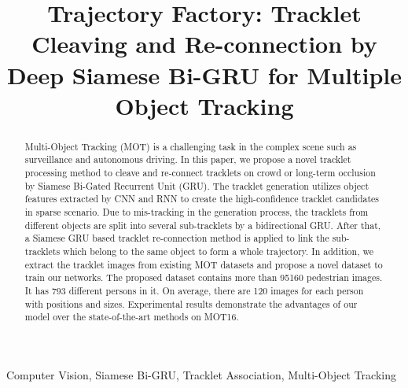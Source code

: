 \documentclass[5pt]{article}
\begin{document}
\sloppy

\def\x{{\mathbf x}}
\def\L{{\cal L}}


\title{Trajectory Factory: Tracklet Cleaving and Re-connection by\\ Deep Siamese Bi-GRU for Multiple Object Tracking}
\address{National Engineering Laboratory for Video Technology, Peking University, Beijing, China \\
\{Cong-Reeshard.Ma, csyang, fyang.eecs, zhuangyq, zhangziw, hzjia, donxie\}@pku.edu.cn}


\maketitle



\begin{abstract}
Multi-Object Tracking (MOT) is a challenging task in the complex scene such as surveillance and autonomous driving. In this paper, we propose a novel tracklet processing method to cleave and re-connect tracklets on crowd or long-term occlusion by Siamese Bi-Gated Recurrent Unit (GRU). The tracklet generation utilizes object features extracted by CNN and RNN to create the high-confidence tracklet candidates in sparse scenario. Due to mis-tracking in the generation process, the tracklets from different objects are split into several sub-tracklets by a bidirectional GRU. After that, a Siamese GRU based tracklet re-connection method is applied to link the sub-tracklets which belong to the same object to form a whole trajectory. In addition, we extract the tracklet images from existing MOT datasets and propose a novel dataset to train our networks. The proposed dataset contains more than 95160 pedestrian images. It has 793 different persons in it. On average, there are 120 images for each person with positions and sizes. Experimental results demonstrate the advantages of our model over the state-of-the-art methods on MOT16.
\end{abstract}
\begin{keywords}
Computer Vision, Siamese Bi-GRU, Tracklet Association, Multi-Object Tracking
\end{keywords}
\vspace{-0.1cm}
\end{document}
